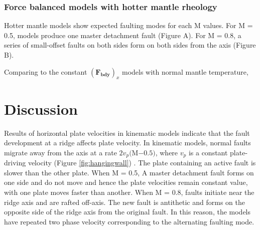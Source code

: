 \documentclass[letterpaper,12pt,notitle]{memphisthesis}                     %
\begin{document}
\subsection{Force balanced models with hotter mantle rheology}

Hotter mantle models show expected faulting modes for each M values. For M = 0.5, models produce one master detachment fault (Figure A). For M = 0.8, a series of small-offset faults on both sides form on both sides from the axis (Figure B).

Comparing to the constant $(\boldsymbol{F_{bdy}})_x$ models with normal mantle temperature, 



\chapter{Discussion}

Results of horizontal plate velocities in kinematic models indicate that the fault development at a ridge affects plate velocity. In kinematic models, normal faults migrate away from the axis at a rate $2v_p($M$-0.5)$, where $v_p$ is a constant plate-driving velocity (Figure \ref{fig:hangingwall}) \citep{Buck2005}. The plate containing an active fault is slower than the other plate. When M = 0.5, A master detachment fault forms on one side and do not move and hence the plate velocities remain constant value, with one plate moves faster than another. When M = 0.8, faults initiate near the ridge axis and are rafted off-axis. The new fault is antithetic and forms on the opposite side of the ridge axis from the original fault. In this reason, the models have repeated two phase velocity corresponding to the alternating faulting mode.
\end{document}
